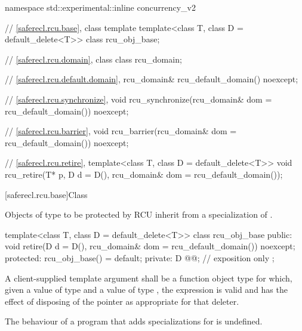 \begin{codeblock}
namespace std::experimental::inline concurrency_v2 {
  // \ref{saferecl.rcu.base}, class template 
  template<class T, class D = default_delete<T>>
    class rcu_obj_base;

  // \ref{saferecl.rcu.domain}, class 
  class rcu_domain;

  // \ref{saferecl.rcu.default.domain}, 
  rcu_domain& rcu_default_domain() noexcept;

  // \ref{saferecl.rcu.synchronize}, 
  void rcu_synchronize(rcu_domain& dom = rcu_default_domain()) noexcept;

  // \ref{saferecl.rcu.barrier}, 
  void rcu_barrier(rcu_domain& dom = rcu_default_domain()) noexcept;

  // \ref{saferecl.rcu.retire}, 
  template<class T, class D = default_delete<T>>
    void rcu_retire(T* p, D d = D(), rcu_domain& dom = rcu_default_domain());
}
\end{codeblock}

[saferecl.rcu.base]{Class }


Objects of type  to be protected by RCU inherit from a
specialization of .


\begin{codeblock}
template<class T, class D = default_delete<T>>
class rcu_obj_base {
public:
  void retire(D d = D(), rcu_domain& dom = rcu_default_domain()) noexcept;
protected:
  rcu_obj_base() = default;
private:
  D @@;            // exposition only
};
\end{codeblock}

A client-supplied template argument  shall be a
function object type  for which,
given a value  of type  and a value 
of type , the expression  is valid and
has the effect of disposing of the pointer as appropriate for
that deleter.

The behaviour of a program that adds specializations for
 is undefined.


